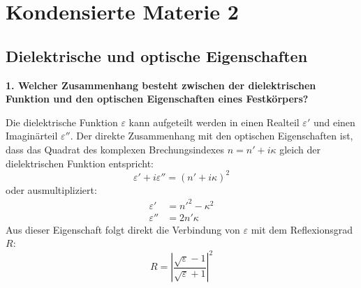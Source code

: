 \section{Kondensierte Materie 2}
\subsection{Dielektrische und optische Eigenschaften}
\noindent\textbf{1. Welcher Zusammenhang besteht zwischen der dielektrischen Funktion und den optischen Eigenschaften eines Festkörpers?}\\
\begin{addmargin}[25pt]{0pt}
Die dielektrische Funktion $\varepsilon$ kann aufgeteilt werden in einen Realteil $\varepsilon'$ und einen Imaginärteil $\varepsilon''$. Der direkte Zusammenhang mit den optischen Eigenschaften ist, dass das Quadrat des komplexen Brechungsindexes $n = n' + i\kappa$ gleich der dielektrischen Funktion entspricht:
\begin{equation}\label{eq:epsilon_n}
    \varepsilon' + i\varepsilon'' = (n' + i\kappa)^2
\end{equation}
oder ausmultipliziert:
\begin{align}
    \varepsilon' &= n'^2 -\kappa^2\\
    \varepsilon'' &= 2n'\kappa
\end{align}
Aus dieser Eigenschaft folgt direkt die Verbindung von $\varepsilon$ mit dem Reflexionsgrad $R$:
\begin{equation}\label{eq:epsilon_R}
    R = \left| \frac{\sqrt{\varepsilon} - 1}{\sqrt{\varepsilon} + 1}\right|^2
\end{equation}
\end{addmargin}

